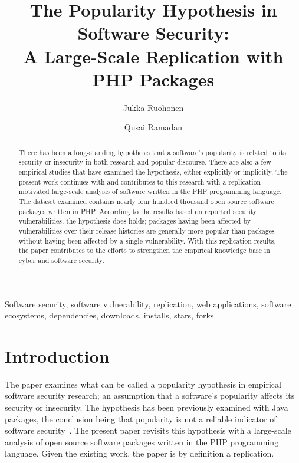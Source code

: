 \documentclass[5p, twocolumn, numbers, sort]{elsarticle}
\begin{document}
\title{The Popularity Hypothesis in Software Security: \\ A Large-Scale Replication
  with PHP Packages}

\author[sdu]{Jukka Ruohonen}
\author[sdu]{Qusai Ramadan}
\address[sdu]{University of Southern Denmark, S\o{}nderborg, Denmark}

\begin{abstract}
There has been a long-standing hypothesis that a software's popularity is
related to its security or insecurity in both research and popular
discourse. There are also a few empirical studies that have examined the
hypothesis, either explicitly or implicitly. The present work continues with and
contributes to this research with a replication-motivated large-scale analysis
of software written in the PHP programming language. The dataset examined
contains nearly four hundred thousand open source software packages written in
PHP. According to the results based on reported security vulnerabilities, the
hypothesis does holds; packages having been affected by vulnerabilities over
their release histories are generally more popular than packages without having
been affected by a single vulnerability. With this replication results, the
paper contributes to the efforts to strengthen the empirical knowledge base in
cyber and software security.
\end{abstract}

\begin{keyword}
Software security, software vulnerability, replication, web applications,
software ecosystems, dependencies, downloads, installs, stars, forks
\end{keyword}

\maketitle

\section{Introduction}

The paper examines what can be called a popularity hypothesis in empirical
software security research; an assumption that a software's popularity affects
its security or insecurity. The hypothesis has been previously examined with
Java packages, the conclusion being that popularity is not a reliable indicator
of software security~\cite{Siavvas18}. The present paper revisits this
hypothesis with a large-scale analysis of open source software packages written
in the PHP programming language. Given the existing work, the paper is by
definition a replication.
\end{document}
